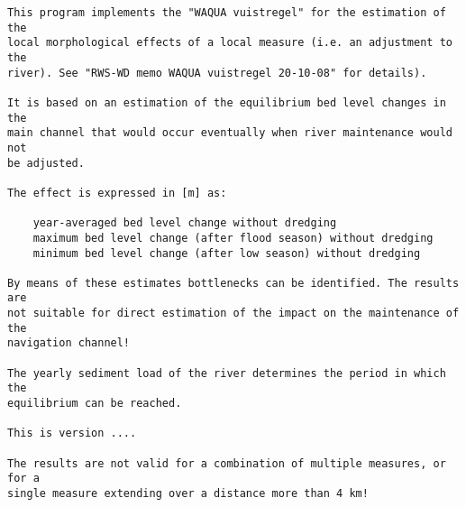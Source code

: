\begin{Verbatim}[frame=single, framesep=5pt]
This program implements the "WAQUA vuistregel" for the estimation of the
local morphological effects of a local measure (i.e. an adjustment to the
river). See "RWS-WD memo WAQUA vuistregel 20-10-08" for details).

It is based on an estimation of the equilibrium bed level changes in the
main channel that would occur eventually when river maintenance would not
be adjusted.

The effect is expressed in [m] as:

    year-averaged bed level change without dredging
    maximum bed level change (after flood season) without dredging
    minimum bed level change (after low season) without dredging

By means of these estimates bottlenecks can be identified. The results are
not suitable for direct estimation of the impact on the maintenance of the
navigation channel!

The yearly sediment load of the river determines the period in which the
equilibrium can be reached.

This is version ....

The results are not valid for a combination of multiple measures, or for a
single measure extending over a distance more than 4 km!
\end{Verbatim}
